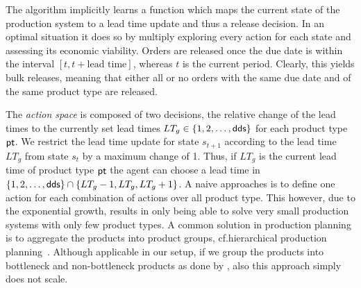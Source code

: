 \documentclass[envcountsame]{llncs}
\begin{document}
The algorithm implicitly learns a function which maps the current state of the production
system to a lead time update and thus a release decision. In an optimal situation it does so by
multiply exploring every action for each state and assessing its economic viability.
%
Orders are released once the due date is within the interval $[t,t+\text{lead time}]$, whereas $t$
is the current period. Clearly, this yields bulk releases, meaning that either all or no orders with
the same due date and of the same product type are released.

The \textit{action space} is composed of two decisions, the relative change of the lead times to the
currently set lead times $LT_{g} \in \{1,2,\ldots,\textsf{dds}\}$ for each product type $\mathsf{pt}$.
%
We restrict the lead time update for state $s_{t+1}$ according to the lead time $LT_{g}$ from state
$s_{t}$ by a maximum change of 1. Thus, if $LT_{g}$ is the current lead time of product type $\mathsf{pt}$
the agent can choose a lead time in $\{1,2,\ldots,\textsf{dds}\} \cap \{LT_{g}-1,LT_{g},LT_{g}+1\}$. %
A naive approaches is to define one action for each combination of actions over all product type.
This however, due to the exponential growth, results in only being able to solve very small
production systems with only few product types. A common solution in production planning is to
aggregate the products into product groups, cf.\@ hierarchical production
planning~\citep{schneeweibeta1995hierarchical}.
%
Although applicable in our setup, if we group the products into bottleneck and non-bottleneck
products as done by \citet{schneckenreither2020order}, also this approach simply does not scale.
\end{document}
